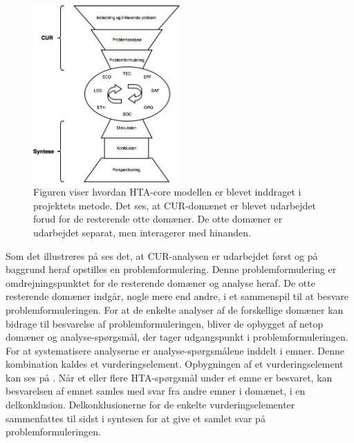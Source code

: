 \begin{figure}[H] 
	\begin{center}
		\includegraphics[width=0.5\textwidth]{figures/cMetode/metode}
	\end{center}
	\caption{Figuren viser hvordan HTA-core modellen er blevet inddraget i projektets metode. Det ses, at CUR-domænet er blevet udarbejdet forud for de resterende otte domæner. De otte domæner er udarbejdet separat, men interagerer med hinanden.} 
	\label{fig:metode} 
\end{figure}

Som det illustreres på  ses det, at CUR-analysen er udarbejdet først og på baggrund heraf opstilles en problemformulering. Denne problemformulering er omdrejningspunktet for de resterende domæner og analyse heraf. De otte resterende domæner indgår, nogle mere end andre, i et sammenspil til at besvare problemformuleringen. For at de enkelte analyser af de forskellige domæner kan bidrage til besvarelse af problemformuleringen, bliver de opbygget af netop domæner og analyse-spørgsmål, der tager udgangspunkt i problemformuleringen. For at systematisere analyserne er analyse-spørgsmålene inddelt i emner. Denne kombination kaldes et vurderingselement. Opbygningen af et vurderingselement kan ses på . Når et eller flere HTA-spørgsmål under et emne er besvaret, kan besvarelsen af emnet samles med svar fra andre emner i domænet, i en delkonklusion. Delkonklusionerne for de enkelte vurderingselementer sammenfattes til sidst i syntesen for at give et samlet svar på problemformuleringen.\citep{HTAcore}


